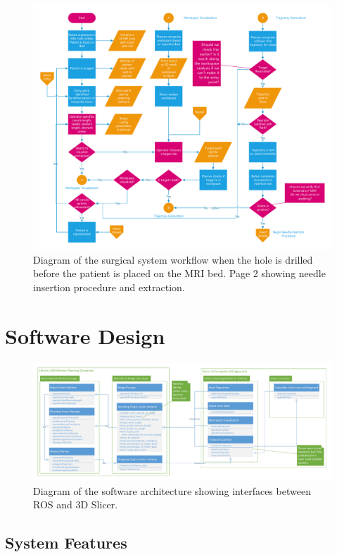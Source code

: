 \documentclass[12pt]{report}
\begin{document}
\begin{figure}[thpb]
	\centering
    \includegraphics[page=2,width=\textwidth]{diagrams/Surgical_Workflow_-_Hole_Predrilled.pdf}
    \caption{Diagram of the surgical system workflow when the hole is drilled before the patient is placed on the MRI bed. Page 2 showing needle insertion procedure and extraction.}
    \label{fig:surgicalWorkflowPg2}
\end{figure}


\section{Software Design}
\begin{figure}[thpb]
	\centering
	\includegraphics[width=\textwidth]{diagrams/Software_Diagrams.pdf}
    \caption{Diagram of the software architecture showing interfaces between ROS and 3D Slicer. }
    \label{fig:softwareDiagram}
\end{figure}

\subsection{System Features}
\end{document}
